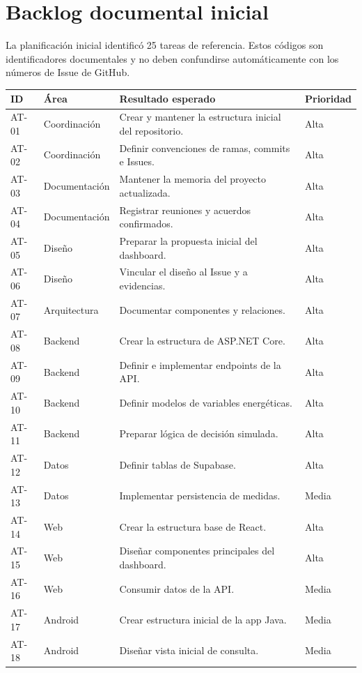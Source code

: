 \documentclass[11pt,a4paper,oneside]{report}
\begin{document}
\section{Backlog documental inicial}

La planificación inicial identificó 25 tareas de referencia. Estos códigos son identificadores documentales y no deben confundirse automáticamente con los números de Issue de GitHub.

\small
\begin{longtable}{@{}p{1.4cm}p{2.5cm}p{7.0cm}p{1.5cm}@{}}
\toprule
\textbf{ID} & \textbf{Área} & \textbf{Resultado esperado} & \textbf{Prioridad} \\
\midrule
\endhead
AT-01 & Coordinación & Crear y mantener la estructura inicial del repositorio. & Alta \\
AT-02 & Coordinación & Definir convenciones de ramas, commits e Issues. & Alta \\
AT-03 & Documentación & Mantener la memoria del proyecto actualizada. & Alta \\
AT-04 & Documentación & Registrar reuniones y acuerdos confirmados. & Alta \\
AT-05 & Diseño & Preparar la propuesta inicial del dashboard. & Alta \\
AT-06 & Diseño & Vincular el diseño al Issue y a evidencias. & Alta \\
AT-07 & Arquitectura & Documentar componentes y relaciones. & Alta \\
AT-08 & Backend & Crear la estructura de ASP.NET Core. & Alta \\
AT-09 & Backend & Definir e implementar endpoints de la API. & Alta \\
AT-10 & Backend & Definir modelos de variables energéticas. & Alta \\
AT-11 & Backend & Preparar lógica de decisión simulada. & Alta \\
AT-12 & Datos & Definir tablas de Supabase. & Alta \\
AT-13 & Datos & Implementar persistencia de medidas. & Media \\
AT-14 & Web & Crear la estructura base de React. & Alta \\
AT-15 & Web & Diseñar componentes principales del dashboard. & Alta \\
AT-16 & Web & Consumir datos de la API. & Media \\
AT-17 & Android & Crear estructura inicial de la app Java. & Media \\
AT-18 & Android & Diseñar vista inicial de consulta. & Media \\

\end{longtable}
\end{document}
